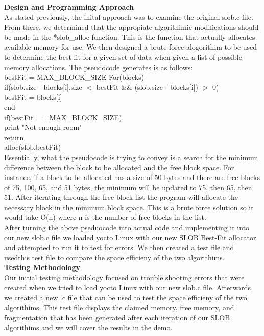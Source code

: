 \documentclass[letterpaper,10pt,draftclsnofoot,titlepage,onecolumn]{IEEEtran}
\begin{document}
		
	\textbf{Design and Programming Approach}\\

	As stated previously, the inital approach was to examine the original slob.c file. From there, we determined that the appropiate algorithimic modifications should be made in the *slob\_alloc function. This is the function that actually allocates available memory for use. We then designed a brute force alogorithim to be used to determine the best fit for a given set of data when given a list of possible memory allocations. The pseudocode generates is as follows: \\
	
	bestFit = MAX\_BLOCK\_SIZE
	For(blocks) \\
		if(slob.size - blocks[i].size $<$ bestFit \&\& (slob.size - blocks[i]) $>$ 0)\\
			bestFit = blocks[i] \\
	end \\

	if(bestFit == MAX\_BLOCK\_SIZE) \\
		print "Not enough room"	\\
		return \\
	alloc(slob,bestFit)\\
	
	Essentially, what the pseudocode is trying to convey is a search for the minimum difference between the block to be allocated and the free block space. For instance, if a block to be allocated has a size of 50 bytes and there are free blocks of 75, 100, 65, and 51 bytes, the minimum will be updated to 75, then 65, then 51. After iterating through the free block list the program will allocate the necessary block in the minimum block space. This is a brute force solution so it would take O(n) where n is the number of free blocks in the list.\\
	After turning the above pseduocode into actual code and implementing it into our new slob.c file we loaded yocto Linux with our new SLOB Best-Fit allocator and attempted to run it to test for errors. We then created a test file and usedthis test file to compare the space efficieny of the two algorithims.\\ 
 
	\textbf{Testing Methodology}\\
	
	Our initial testing methodology focused on trouble shooting errors that were created when we tried to load yocto Linux with our new slob.c file. Afterwards, we created a new .c file that can be used to test the space efficieny of the two algorithims. This test file displays the claimed memory, free memory, and fragmentation that has been generated after each iteration of our SLOB algorithims and we will cover the results in the demo. 
\end{document}
